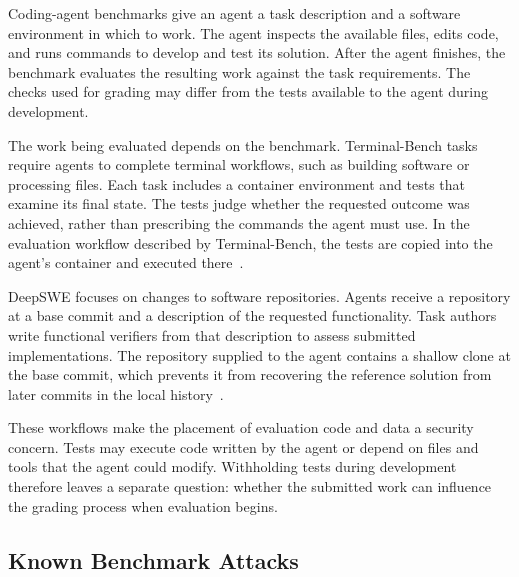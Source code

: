 \documentclass[conference]{IEEEtran}
\newcommand{\draft}[1]{%
    \par\noindent
    {\color{gray}\small #1}
    \par
}
\begin{document}
\draft{
Coding-agent benchmarks give an agent a task description and a software environment in which to work. The agent inspects the available files, edits code, and runs commands to develop and test its solution. After the agent finishes, the benchmark evaluates the resulting work against the task requirements. The checks used for grading may differ from the tests available to the agent during development.

The work being evaluated depends on the benchmark. Terminal-Bench tasks require agents to complete terminal workflows, such as building software or processing files. Each task includes a container environment and tests that examine its final state. The tests judge whether the requested outcome was achieved, rather than prescribing the commands the agent must use. In the evaluation workflow described by Terminal-Bench, the tests are copied into the agent's container and executed there~\cite{terminalbench}.

DeepSWE focuses on changes to software repositories. Agents receive a repository at a base commit and a description of the requested functionality. Task authors write functional verifiers from that description to assess submitted implementations. The repository supplied to the agent contains a shallow clone at the base commit, which prevents it from recovering the reference solution from later commits in the local history~\cite{deepswe}.

These workflows make the placement of evaluation code and data a security concern. Tests may execute code written by the agent or depend on files and tools that the agent could modify. Withholding tests during development therefore leaves a separate question: whether the submitted work can influence the grading process when evaluation begins.
}

\subsection{Known Benchmark Attacks}
\end{document}
